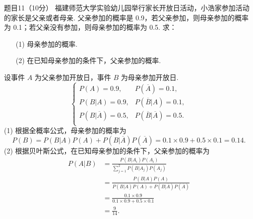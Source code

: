 \begin{question}{题目11（10分）}
    福建师范大学实验幼儿园举行家长开放日活动，小浩家参加活动的家长是父亲或者母亲. 父亲参加的概率是 0.9，若父亲参加，则母亲参加的概率为 0.1；若父亲没有参加，则母亲参加的概率为 0.5. 求：

    \begin{itemize}
        \item [(1)] 母亲参加的概率.
        \item [(2)] 在已知母亲参加的条件下，父亲参加的概率.
    \end{itemize}
\end{question}
\begin{solution}
    设事件 $A$ 为父亲参加开放日，事件 $B$ 为母亲参加开放日.
    $$
        \begin{cases}
            P(A) = 0.9,              & P(\overline{A}) = 0.1,              \\
            P(B|A) = 0.9,            & P(\overline{B}|A) = 0.1,            \\
            P(B|\overline{A}) = 0.5, & P(\overline{B}|\overline{A}) = 0.5. \\
        \end{cases}
    $$
    (1) 根据全概率公式，母亲参加的概率为
    $$
        P(B) = P(B|A)P(A) + P(B|\overline{A})P(\overline{A})
        = 0.1 \times 0.9 + 0.5 \times 0.1
        = 0.14.
    $$
    (2) 根据贝叶斯公式，在已知母亲参加的条件下，父亲参加的概率为
    $$
        \begin{aligned}
            P(A|B)
             & = \frac{P(B|A_i)P(A_i)}{\sum\limits_{j=1}^2 P(B|A_j)P(A_j)}        \\
             & = \frac{P(B|A)P(A)}{P(B|A)P(A) + P(B|\overline{A})P(\overline{A})} \\
             & = \frac{0.1 \times 0.9}{0.1 \times 0.9 + 0.5 \times 0.1}           \\
             & = \frac{9}{14}.                                                    \\
        \end{aligned}
    $$
\end{solution}

